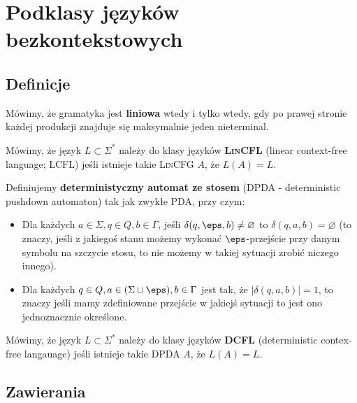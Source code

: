 \section{Podklasy języków bezkontekstowych}
\label{cfl-subclassses}

\subsection{Definicje}

\begin{definition}  
    Mówimy, że gramatyka jest \textbf{liniowa} wtedy i tylko wtedy, gdy po prawej stronie każdej produkcji znajduje się maksymalnie jeden nieterminal.
\end{definition}

\begin{definition}
    Mówimy, że język \(L \subset \Sigma^*\) należy do klasy języków \textbf{\textsc{LinCFL}} (linear context-free language; LCFL) jeśli istnieje takie \textsc{LinCFG} \(A\), że \(L(A) = L\).
\end{definition}

\begin{definition}
    Definiujemy \textbf{deterministyczny automat ze stosem} (DPDA - deterministic pushdown automaton) tak jak zwykłe PDA, przy czym:
    
    \begin{itemize}
        \item Dla każdych \( a \in \Sigma, q \in Q, b \in \Gamma \), jeśli \( \delta(q, \eps, b) \not = \varnothing \) to \( \delta(q, a, b) = \varnothing \) (to znaczy, jeśli z jakiegoś stanu możemy wykonać \(\eps\)-przejście przy danym symbolu na szczycie stosu, to nie możemy w takiej sytuacji zrobić niczego innego).
        \item Dla każdych \( q \in Q, a \in (\Sigma \cup \eps) , b \in \Gamma \) jest tak, że \( |\delta(q, a, b)| = 1\), to znaczy jeśli mamy zdefiniowane przejście w jakiejś sytuacji to jest ono jednoznacznie określone. 
    \end{itemize}
\end{definition}

\begin{definition}
    Mówimy, że język \(L \subset \Sigma^*\) należy do klasy języków \textbf{DCFL} (deterministic contex-free langauage) jeśli istnieje takie DPDA \(A\), że \(L(A) = L\).
\end{definition}

\subsection{Zawierania}

